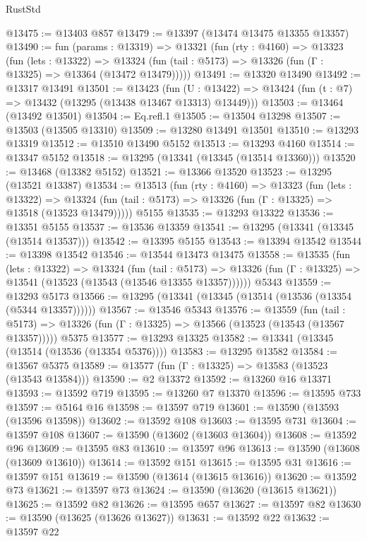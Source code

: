 \begin{lexlean}{RustStd}
\begin{coremodule}
@13475 := @13403 @857
@13479 := @13397 (@13474 @13475 @13355 @13357)
@13490 := fun (params : @13319) =>
  @13321
    (fun (rty : @4160) =>
    @13323
      (fun (lets : @13322) =>
      @13324 (fun (tail : @5173) => @13326 (fun (Γ : @13325) => @13364 (@13472 @13479)))))
@13491 := @13320 @13490
@13492 := @13317 @13491
@13501 := @13423
    (fun (U : @13422) => @13424 (fun (t : @7) => @13432 (@13295 (@13438 @13467 @13313) @13449)))
@13503 := @13464 (@13492 @13501)
@13504 := Eq.refl.{1}
@13505 := @13504 @13298
@13507 := @13503 (@13505 @13310)
@13509 := @13280 @13491 @13501
@13510 := @13293 @13319
@13512 := @13510 @13490 @5152
@13513 := @13293 @4160
@13514 := @13347 @5152
@13518 := @13295 (@13341 (@13345 (@13514 @13360)))
@13520 := @13468 (@13382 @5152)
@13521 := @13366 @13520
@13523 := @13295 (@13521 @13387)
@13534 := @13513
    (fun (rty : @4160) =>
    @13323
      (fun (lets : @13322) =>
      @13324 (fun (tail : @5173) => @13326 (fun (Γ : @13325) => @13518 (@13523 @13479)))))
    @5155
@13535 := @13293 @13322
@13536 := @13351 @5155
@13537 := @13536 @13359
@13541 := @13295 (@13341 (@13345 (@13514 @13537)))
@13542 := @13395 @5155
@13543 := @13394 @13542
@13544 := @13398 @13542
@13546 := @13544 @13473 @13475
@13558 := @13535
    (fun (lets : @13322) =>
    @13324
      (fun (tail : @5173) =>
      @13326 (fun (Γ : @13325) => @13541 (@13523 (@13543 (@13546 @13355 @13357))))))
    @5343
@13559 := @13293 @5173
@13566 := @13295 (@13341 (@13345 (@13514 (@13536 (@13354 (@5344 @13357))))))
@13567 := @13546 @5343
@13576 := @13559
    (fun (tail : @5173) => @13326 (fun (Γ : @13325) => @13566 (@13523 (@13543 (@13567 @13357)))))
    @5375
@13577 := @13293 @13325
@13582 := @13341 (@13345 (@13514 (@13536 (@13354 @5376))))
@13583 := @13295 @13582
@13584 := @13567 @5375
@13589 := @13577 (fun (Γ : @13325) => @13583 (@13523 (@13543 @13584)))
@13590 := @2 @13372
@13592 := @13260 @16 @13371
@13593 := @13592 @719
@13595 := @13260 @7 @13370
@13596 := @13595 @733
@13597 := @5164 @16
@13598 := @13597 @719
@13601 := @13590 (@13593 (@13596 @13598))
@13602 := @13592 @108
@13603 := @13595 @731
@13604 := @13597 @108
@13607 := @13590 (@13602 (@13603 @13604))
@13608 := @13592 @96
@13609 := @13595 @83
@13610 := @13597 @96
@13613 := @13590 (@13608 (@13609 @13610))
@13614 := @13592 @151
@13615 := @13595 @31
@13616 := @13597 @151
@13619 := @13590 (@13614 (@13615 @13616))
@13620 := @13592 @73
@13621 := @13597 @73
@13624 := @13590 (@13620 (@13615 @13621))
@13625 := @13592 @82
@13626 := @13595 @657
@13627 := @13597 @82
@13630 := @13590 (@13625 (@13626 @13627))
@13631 := @13592 @22
@13632 := @13597 @22

\end{coremodule}
\end{lexlean}
